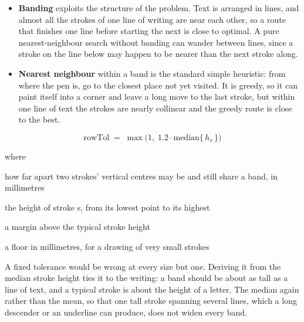 \begin{itemize}\setlength\itemsep{0pt}
  \item \textbf{Banding} exploits the structure of the problem. Text is arranged in lines, and almost all the strokes of one line of writing are near each other, so a route that finishes one line before starting the next is close to optimal. A pure nearest-neighbour search without banding can wander between lines, since a stroke on the line below may happen to be nearer than the next stroke along.
  \item \textbf{Nearest neighbour} within a band is the standard simple heuristic: from where the pen is, go to the closest place not yet visited. It is greedy, so it can paint itself into a corner and leave a long move to the last stroke, but within one line of text the strokes are nearly collinear and the greedy route is close to the best.
\end{itemize}


\begin{equation}
\mathrm{rowTol} \;=\; \max\big(1,\; 1.2 \cdot \mathrm{median}\{\,h_s\,\}\big)
\end{equation}

\noindent where
\begin{description}[leftmargin=2.4em,style=nextline,font=\normalfont\ttfamily]\setlength\itemsep{1pt}
  \item[{$\mathrm{rowTol}$}] \normalfont how far apart two strokes' vertical centres may be and still share a band, in millimetres
  \item[{$h_s$}] \normalfont the height of stroke s, from its lowest point to its highest
  \item[{$1.2$}] \normalfont a margin above the typical stroke height
  \item[{$1$}] \normalfont a floor in millimetres, for a drawing of very small strokes
\end{description}
A fixed tolerance would be wrong at every size but one. Deriving it from the median stroke height ties it to the writing: a band should be about as tall as a line of text, and a typical stroke is about the height of a letter. The median again rather than the mean, so that one tall stroke spanning several lines, which a long descender or an underline can produce, does not widen every band.


